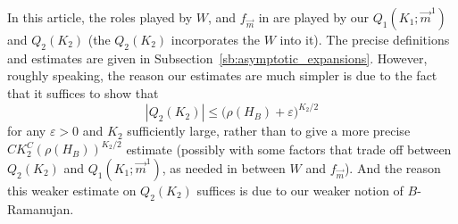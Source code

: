 \documentclass{memo-l}
\theoremstyle{plain}
\theoremstyle{definition}
\numberwithin{section}{chapter}
\numberwithin{equation}{chapter}
\theoremstyle{plain}
\theoremstyle{definition}
\begin{document}
In this article, 
the roles played by $W$, and $f_{\vec m}$ in
\cite{friedman_alon} are played by our $Q_1(K_1;\vec m^1)$ and
$Q_2(K_2)$ (the $Q_2(K_2)$ incorporates the $W$ into it).
The precise definitions and estimates are given
in Subsection~\ref{sb:asymptotic_expansions}. 
However, roughly speaking, the reason our
estimates are much
simpler is due to the fact that it suffices to show that
$$
|Q_2(K_2)| \le \bigl(\rho(H_B)+\varepsilon\bigr)^{K_2/2}
$$
for any $\varepsilon>0$ and $K_2$ sufficiently large, rather
than to give a more precise $CK_2^C(\rho(H_B))^{K_2/2}$ estimate
(possibly with some factors that trade off between
$Q_2(K_2)$ and $Q_1(K_1;\vec m^1)$, as needed in \cite{friedman_alon}
between $W$ and $f_{\vec m}$).
And the reason this weaker estimate on $Q_2(K_2)$
suffices is due to our weaker notion of $B$-Ramanujan.

\end{document}
